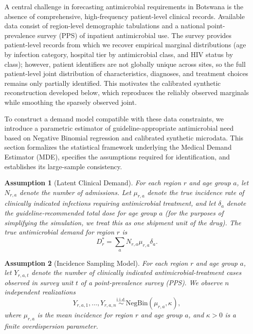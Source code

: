 \documentclass{article}
\begin{document}
A central challenge in forecasting antimicrobial requirements in Botswana is the absence of comprehensive, high-frequency patient-level clinical records. Available data consist of region-level demographic tabulations and a national point-prevalence survey (PPS) of inpatient antimicrobial use. The survey provides patient-level records from which we recover empirical marginal distributions (age by infection category, hospital tier by antimicrobial class, and HIV status by class); however, patient identifiers are not globally unique across sites, so the full patient-level joint distribution of characteristics, diagnoses, and treatment choices remains only partially identified. This motivates the calibrated synthetic reconstruction developed below, which reproduces the reliably observed marginals while smoothing the sparsely observed joint.

To construct a demand model compatible with these data constraints, we introduce a parametric estimator of guideline-appropriate antimicrobial need based on Negative Binomial regression and calibrated synthetic microdata. This section formalizes the statistical framework underlying the Medical Demand Estimator (MDE), specifies the assumptions required for identification, and establishes its large-sample consistency.

\newtheorem{assumption}{Assumption}
\newtheorem{definition}{Definition}
\newtheorem{remark}{Remark}
\newtheorem{theorem}{Theorem}
\newtheorem{lemma}{Lemma}

\begin{assumption}[Latent Clinical Demand]
\label{assump:dtrue}
For each region $r$ and age group $a$, let $N_{r,a}$ denote the number of admissions. Let $\mu_{r,a}$ denote the true incidence rate of clinically indicated infections requiring antimicrobial treatment, and let $\delta_a$ denote the guideline-recommended total dose for age group $a$ (for the purposes of simplifying the simulation, we treat this as one shipment unit of the drug). The true antimicrobial demand for region $r$ is
\[
D_r^{*}
=
\sum_a N_{r,a}\mu_{r,a}\delta_a.
\]
\end{assumption}

\begin{assumption}[Incidence Sampling Model]
\label{assump:nb}
For each region $r$ and age group $a$, let $Y_{r,a,t}$ denote the number of clinically indicated antimicrobial-treatment cases observed in survey unit $t$ of a point-prevalence survey (PPS). We observe $n$ independent realizations
\[
Y_{r,a,1},\dots,Y_{r,a,n}
\overset{\mathrm{i.i.d.}}{\sim}
\mathrm{NegBin}(\mu_{r,a},\kappa),
\]
where $\mu_{r,a}$ is the mean incidence for region $r$ and age group $a$, and $\kappa>0$ is a finite overdispersion parameter.
\end{assumption}
\end{document}
